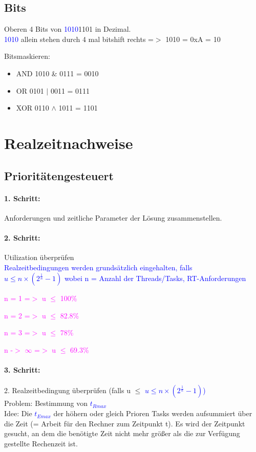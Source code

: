 \documentclass[12pt,a4paper,oneside,ngerman]{article}
\begin{document}
\subsection{Bits}
Oberen 4 Bits von \textcolor{blue}{1010}1101 in Dezimal. \\
\textcolor{blue}{1010} allein stehen durch 4 mal bitshift rechts =$>$ 1010 = 0xA = 10

Bitsmaskieren:
\begin{itemize}
	\item AND 1010 \& 0111 = 0010
	\item OR 0101 $|$ 0011 = 0111
	\item XOR 0110 $\wedge$ 1011 = 1101
\end{itemize}

\section{Realzeitnachweise}
\subsection{Prioritätengesteuert}

\paragraph{1. Schritt:}
Anforderungen und zeitliche Parameter der Lösung zusammenstellen.
\paragraph{2. Schritt:}
Utilization überprüfen\\
\textcolor{blue}{Realzeitbedingungen werden grundsätzlich eingehalten, falls}\\

\textcolor{blue}{\(u \leq n\times( 2^\frac{1}{n} - 1)\) wobei n = Anzahl der Threads/Tasks, RT-Anforderungen}
\begin{description}
	\item \textcolor{magenta}{n = 1 =$>$ u \(\leq\) 100\%}
	\item \textcolor{magenta}{n = 2 =$>$ u \(\leq\) 82.8\%}
	\item \textcolor{magenta}{n = 3 =$>$ u \(\leq\) 78\%}
	\item \textcolor{magenta}{n -$>$ $\infty$ =$>$ u \(\leq\) 69.3\%}
\end{description}

\paragraph{3. Schritt:}
2. Realzeitbedingung überprüfen (falls u $\leq$ \textcolor{blue}{\(u \leq n\times( 2^\frac{1}{n} - 1)\))}\\
Problem: Bestimmung von \textcolor{blue}{\(t_{Rmax}\)} \\
Idee: Die \textcolor{blue}{\(t_{Emax}\)} der höhern oder gleich Prioren Tasks werden aufsummiert über die Zeit (= Arbeit für den Rechner zum Zeitpunkt t).
Es wird der Zeitpunkt gesucht, an dem die benötigte Zeit nicht mehr größer als die zur Verfügung gestellte Rechenzeit ist.\\
\end{document}
